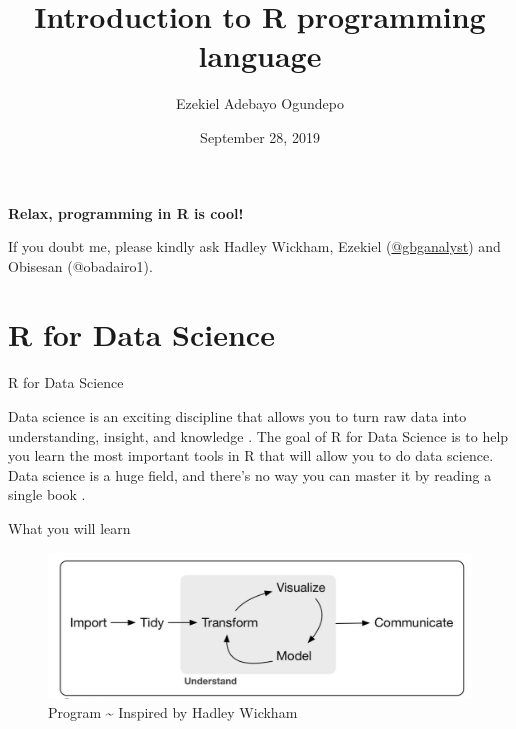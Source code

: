 \documentclass[
  ignorenonframetext,
]{beamer}
\title{Introduction to R programming language}
\author{Ezekiel Adebayo Ogundepo}
\date{September 28, 2019}
\begin{document}
\frame{\titlepage}

\begin{frame}
  \tableofcontents[hideallsubsections]
\end{frame}
\begin{frame}

\begin{center}
\textbf{Relax, programming in R is cool!}
\end{center}

If you doubt me, please kindly ask Hadley Wickham, Ezekiel
(\href{https://twitter.com/gbganalyst}{@gbganalyst}) and Obisesan
(@obadairo1).

\end{frame}
\section{R for Data Science}


\begin{frame}{R for Data Science}
\protect\hypertarget{r-for-data-science}{}

Data science is an exciting discipline that allows you to turn raw data
into understanding, insight, and knowledge \cite{P}. The goal of R for
Data Science is to help you learn the most important tools in R that
will allow you to do data science. Data science is a huge field, and
there's no way you can master it by reading a single book \cite{P}.

\end{frame}

\begin{frame}{What you will learn}
\protect\hypertarget{what-you-will-learn}{}

\begin{figure}
\centering
\includegraphics{Images/Capture.JPG}
\caption{Program \textasciitilde{} Inspired by Hadley Wickham \cite{P}}
\end{figure}
\end{frame}
\end{document}
